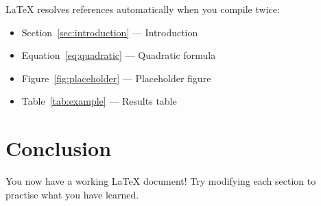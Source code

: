 \documentclass[12pt, a4paper]{article}
\begin{document}
\LaTeX{} resolves references automatically when you compile twice:
\begin{itemize}
    \item Section~\ref{sec:introduction} — Introduction
    \item Equation~\eqref{eq:quadratic} — Quadratic formula
    \item Figure~\ref{fig:placeholder} — Placeholder figure
    \item Table~\ref{tab:example} — Results table
\end{itemize}

\section{Conclusion}

You now have a working \LaTeX{} document!  Try modifying each section to
practise what you have learned.
\end{document}

